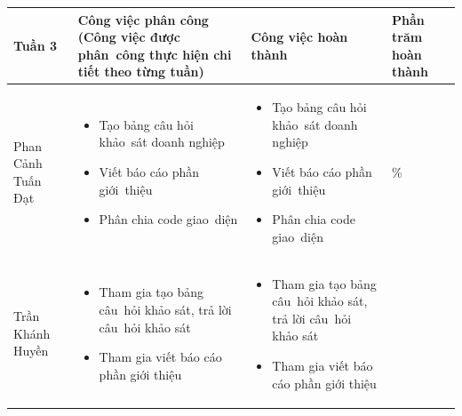 \documentclass[a4paper,12pt]{report}
\begin{document}
\noindent
\begin{center}
    \begin{longtable}{|>{\centering\arraybackslash}p{3cm}|
        >{\centering\arraybackslash}p{5.5cm}|
        >{\centering\arraybackslash}p{5.5cm}|
        >{\centering\arraybackslash}p{1.5cm}|}
        \hline
        \textbf{Tuần 3}                                                    &
        \textbf{Công việc phân công \newline
            (Công việc được phân~công thực hiện chi tiết theo từng tuần)
        }                                                                  &
        \textbf{Công việc hoàn thành}                                      &
        \textbf{Phần trăm hoàn thành}                                              \\
        \hline
        Phan Cảnh Tuấn Đạt                                                 &
        \begin{itemize}
            \item Tạo bảng câu hỏi khảo~sát doanh nghiệp
            \item Viết báo cáo phần giới~thiệu
            \item Phân chia code giao~diện
        \end{itemize}                       &
        \begin{itemize}
            \item Tạo bảng câu hỏi khảo~sát doanh nghiệp
            \item Viết báo cáo phần giới~thiệu
            \item Phân chia code giao~diện
        \end{itemize}
                                                                           & 100\% \\
        \hline
        Trần Khánh Huyền                                                   &
        \begin{itemize}
            \item Tham gia tạo bảng câu~hỏi khảo sát, trả lời câu~hỏi khảo sát
            \item Tham gia viết báo cáo phần giới thiệu
        \end{itemize} &
        \begin{itemize}
            \item Tham gia tạo bảng câu~hỏi khảo sát, trả lời câu~hỏi khảo sát
            \item Tham gia viết báo cáo phần giới thiệu
        \end{itemize}

\end{longtable}
\end{center}
\end{document}
